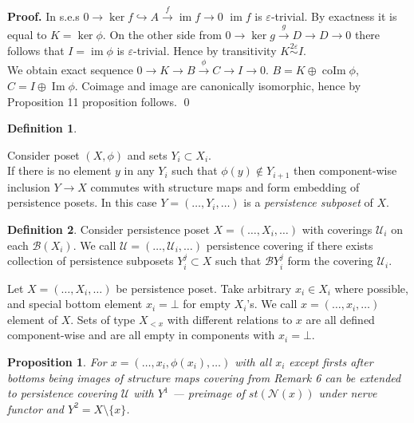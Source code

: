 \documentclass[a4paper, 12pt]{article}
\newtheorem{proposition}{Proposition}
\theoremstyle{definition}
\newtheorem{definition}{Definition}
\theoremstyle{remark}
\newenvironment{pf}{\noindent\textbf{Proof.}}{\qed}
\newcommand{\define}[1]{{\textit{#1}}}
\begin{document}
\begin{pf}
  In s.e.s $0 \to \ker{f} \hookrightarrow A \xrightarrow{f} \operatorname{im}f \to 0$ $\operatorname{im}f$ is $\varepsilon$-trivial. By exactness it is equal to $K = \ker \phi$. On the other side from $0 \to \ker{g} \xrightarrow{g} D \to D \to 0$ there follows that $I = \operatorname{im} \phi$ is $\varepsilon$-trivial. Hence by transitivity $K \stackrel{2\varepsilon}{\sim} I$.\\

  We obtain exact sequence $0 \to K \to B \xrightarrow{\phi} C \to I \to 0$. $B = K \oplus \operatorname{coIm}\phi$, $C = I \oplus \operatorname{Im} \phi$. Coimage and image are canonically isomorphic, hence by Proposition 11 proposition follows.
\end{pf}\\

\begin{definition} ~ \par
  Consider poset $(X,\phi)$ and sets $Y_i \subset X_i$.\\

  If there is no element $y$ in any $Y_i$ such that $\phi(y) \not\in Y_{i+1}$ then component-wise inclusion $Y \to X$ commutes with structure maps and form embedding of persistence posets. In this case $Y=(\ldots,Y_i,\ldots)$ is a \define {persistence subposet} of $X$.
\end{definition}

\begin{definition}
  Consider persistence poset $X = (\ldots,X_i,\ldots)$ with coverings $\mathcal{U}_i$ on each $\mathcal{B}(X_i)$. We call $\mathcal{U} = (\ldots,\mathcal{U}_i,\ldots)$ persistence covering if there exists collection of persistence subposets $Y^j_i \subset X$ such that $\mathcal{B}Y^j_i$ form the covering $\mathcal{U}_i$.\\
\end{definition}

Let $X=(\ldots,X_i,\ldots)$ be persistence poset. Take arbitrary $x_i \in X_i$ where possible, and special bottom element $x_i = \bot$ for empty $X_i$'s. We call $x = (\ldots, x_i, \ldots)$ element of $X$. Sets of type $X_{<x}$ with different relations to $x$ are all defined component-wise and are all empty in components with $x_i = \bot$.\\

\begin{proposition}
  For $x = (\ldots,x_i,\phi(x_i),\ldots)$ with all $x_i$ except firsts after bottoms being images of structure maps covering from Remark 6 can be extended to persistence covering $\mathcal{U}$ with $Y^1$ --- preimage of $st(\mathcal{N}(x))$ under nerve functor and $Y^2 = X \setminus \{x\}$.
\end{proposition}
\end{document}
